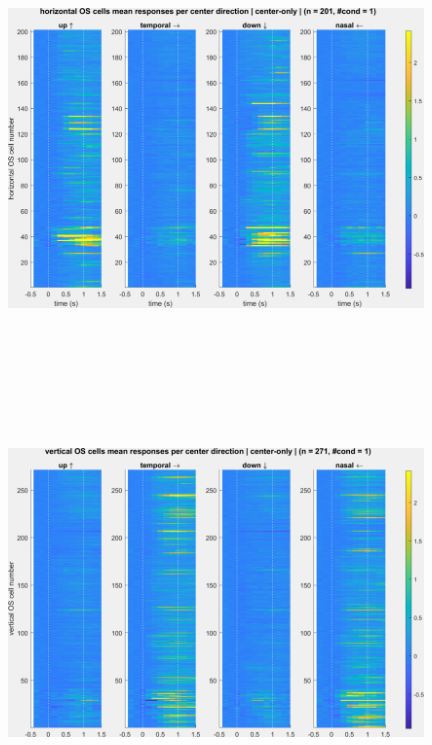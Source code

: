 \begin{figure}[H] \centering \includegraphics[width=11cm,height=11cm,keepaspectratio]{Figures/7.Results/population/sel/11_popPlots_horzOS_centerOnly.png} 
\end{figure}

\begin{figure}[H] \centering \includegraphics[width=11cm,height=11cm,keepaspectratio]{Figures/7.Results/population/sel/12_popPlots_vertOS_centerOnly.png} 
\end{figure}

